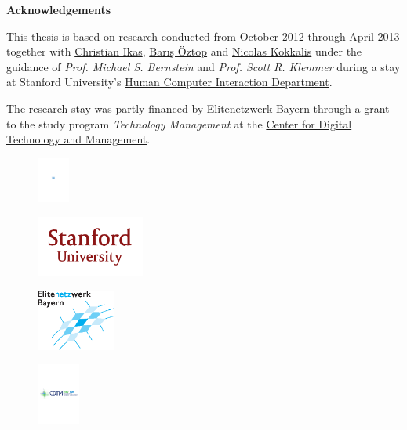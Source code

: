\clearemptydoublepage
{}
{}



\vspace*{2cm}

\begin{center}
{\Large \bf Acknowledgements}
\end{center}

\vspace{1cm}

This thesis is based on research conducted from October 2012 through April 2013 together with \href{mailto:ikas@in.tum.de}{Christian Ikas}, \href{mailto:boztop@gmail.com}{Barış Öztop} and \href{mailto:nicolas@cs.stanford.edu}{Nicolas Kokkalis} under the guidance of \emph{Prof. Michael S. Bernstein} and \emph{Prof. Scott R. Klemmer} during a stay at Stanford University's \href{http://hci.stanford.edu}{Human Computer Interaction Department}.

The research stay was partly financed by \href{https://www.elitenetzwerk.bayern.de}{Elitenetzwerk Bayern} through a grant to the study program \emph{Technology Management} at the \href{http://www.cdtm.de}{Center for Digital Technology and Management}.

\vspace{1cm}

\begin{figure}[h!]
\centering
\includegraphics[height=1.5cm]{styles/tum_logo.pdf}
\end{figure}

\vspace{0.5cm}

\begin{figure}[h!]
\centering
\includegraphics[height=2cm]{styles/stanford_logo.png}
\end{figure}

\vspace{0.5cm}

\begin{figure}[h!]
\centering
\includegraphics[height=2cm]{styles/enb_logo.eps}
\end{figure}

\vspace{0.5cm}

\begin{figure}[h!]
\centering
\includegraphics[height=2cm]{styles/cdtm_logo.pdf}
\end{figure}